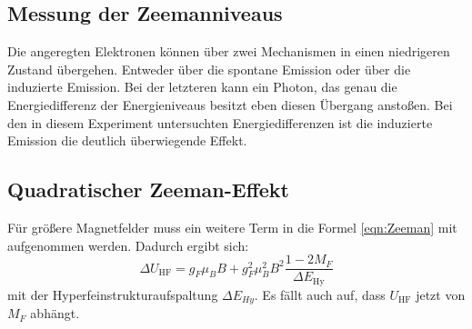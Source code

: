 \subsection{Messung der Zeemanniveaus}
Die angeregten Elektronen können über zwei Mechanismen in einen niedrigeren Zustand übergehen. Entweder über die spontane Emission oder über die induzierte Emission. Bei der letzteren kann ein Photon, das genau die Energiedifferenz der Energieniveaus besitzt eben diesen Übergang anstoßen. Bei den in diesem Experiment untersuchten Energiedifferenzen ist die induzierte Emission die deutlich überwiegende Effekt.
\subsection{Quadratischer Zeeman-Effekt}
Für größere Magnetfelder muss ein weitere Term in die Formel \eqref{eqn:Zeeman} mit aufgenommen werden. Dadurch ergibt sich:
\begin{equation}
	\Delta U_\text{HF}=g_F\mu_BB + g_F^2\mu_B^2B^2\frac{1-2M_F}{\Delta E_\text{Hy}}
	\label{quad}
\end{equation}
mit der Hyperfeinstrukturaufspaltung $\Delta E_{Hy}$. Es fällt auch auf, dass $U_\text{HF}$ jetzt von $M_F$ abhängt.
